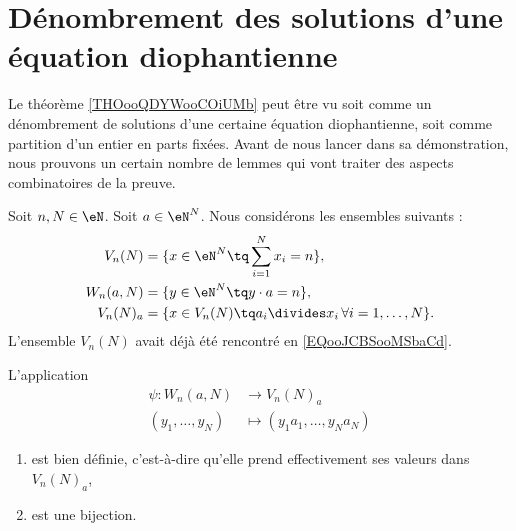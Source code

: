 \section{Dénombrement des solutions d'une équation diophantienne}

Le théorème \ref{THOooQDYWooCOiUMb} peut être vu soit comme un dénombrement de solutions d'une certaine équation diophantienne, soit comme partition d'un entier en parts fixées. Avant de nous lancer dans sa démonstration, nous prouvons un certain nombre de lemmes qui vont traiter des aspects combinatoires de la preuve.

Soit \( n,N\in \eN\). Soit \( a\in \eN^N\). Nous considérons les ensembles suivants :
\begin{subequations}
    \begin{align}
    V_n(N)&=\{ x\in \eN^N\tq \sum_{i=1}^Nx_i=n \}, \\
    W_n(a,N)&=\{ y\in \eN^N\tq y\cdot a=n \},\\
    V_n(N)_a&=\{ x\in V_n(N)\tq a_i\divides x_i\,\forall i=1,\ldots, N \}.
    \end{align}
\end{subequations}
L'ensemble \( V_n(N)\) avait déjà été rencontré en \eqref{EQooJCBSooMSbaCd}.

\begin{lemma}       \label{LEMooLKCAooCeDnSj}
    L'application
    \begin{equation}
        \begin{aligned}
            \psi\colon W_n(a,N)&\to V_n(N)_a \\
            (y_1,\ldots, y_N)&\mapsto (y_1a_1,\ldots, y_Na_N) 
        \end{aligned}
    \end{equation}
    \begin{enumerate}
        \item       
            est bien définie, c'est-à-dire qu'elle prend effectivement ses valeurs dans \( V_n(N)_a\),
        \item
            est une bijection.
    \end{enumerate}
\end{lemma}

